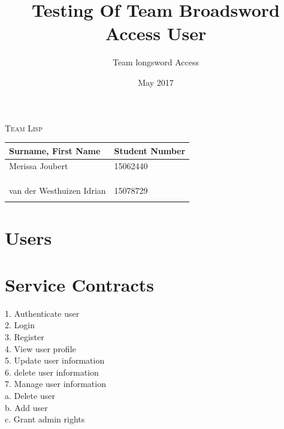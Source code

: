 \documentclass[english]{article}
\begin{document}
\title{Testing Of Team Broadsword Access User }
\author{Team longsword Access }
\date{May 2017}
\maketitle
\begin{center}
{\scshape\Large Team Lisp \par}
\vspace{0.9cm}
	\begin{tabu} to \textwidth { X[l] X[l]}
		\hline
		\textbf{Surname, First Name  }	& \textbf{Student Number}	\\ \hline \hline
		   Merissa Joubert &15062440	\\ \hline
		  &	\\ \hline
		  &	\\ \hline
	    	 &	\\ \hline
		van der Westhuizen Idrian&15078729\\ \hline
		 &	\\ \hline
		\hline
	\end{tabu}
	
	\end{center}

	\newpage
	\tableofcontents

	\newpage

\section{Users}

\section{Service Contracts}
1.	Authenticate user\\
2.	Login\\
3.	Register\\
4.	View user profile\\
5.	Update user information\\
6.	delete user information\\
7.	Manage user information\\
    a.	Delete user\\
    b.	Add user\\
    c.	Grant admin rights\\
\end{document}
